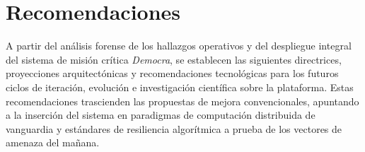 \section{Recomendaciones}
A partir del análisis forense de los hallazgos operativos y del despliegue integral del sistema de misión crítica \textit{Democra}, se establecen las siguientes directrices, proyecciones arquitectónicas y recomendaciones tecnológicas para los futuros ciclos de iteración, evolución e investigación científica sobre la plataforma. Estas recomendaciones trascienden las propuestas de mejora convencionales, apuntando a la inserción del sistema en paradigmas de computación distribuida de vanguardia y estándares de resiliencia algorítmica a prueba de los vectores de amenaza del mañana.

